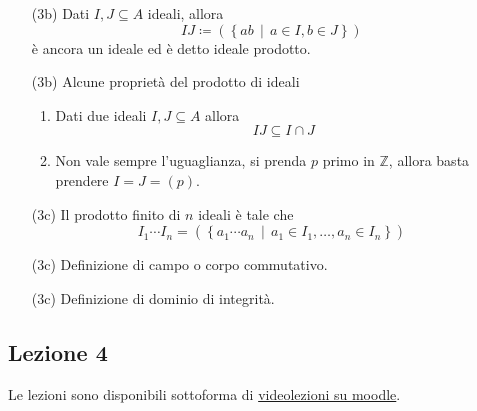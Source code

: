 \documentclass[italian]{article}
\begin{document}
\begin{enumerate}
      \item[(3b)] Dati $I, J\subseteq A$ ideali, allora 
      	\begin{equation*}
	      	IJ \coloneqq (\left\{ab \,\middle|\, a\in I, b \in J\right\})
      	\end{equation*}
      è ancora un ideale ed è detto ideale prodotto.
      \item[(3b)] Alcune proprietà del prodotto di ideali
      \begin{enumerate}
      	\item Dati due ideali $I,J \subseteq A$ allora 
      		\begin{equation*}
	      		IJ \subseteq I \cap J
      		\end{equation*}
      	\item Non vale sempre l'uguaglianza, si prenda $p$ primo in $\mathbb{Z}$, 
      	allora basta prendere $I = J = (p)$.
      \end{enumerate}
  	  \item[(3c)] Il prodotto finito di $n$ ideali è tale che 
  	  \begin{equation*}
	  	  I_1 \cdots I_n = (\left\{a_1 \cdots a_n \, \middle|\, a_1 \in I_1, \dots, a_n \in I_n\right\})
  	  \end{equation*}
      \item[(3c)] Definizione di campo o corpo commutativo.
      \item[(3c)] Definizione di dominio di integrità.
    \end{enumerate}

    \subsection{Lezione 4}

    Le lezioni sono disponibili sottoforma di 
    \href{https://didatticaonline.unitn.it/dol/course/view.php?id=23268}{videolezioni
    su moodle}.
    
\end{document}
